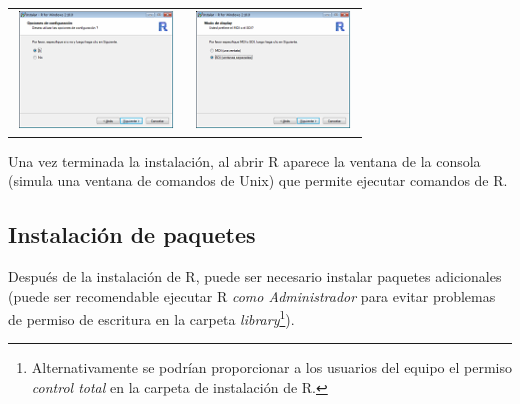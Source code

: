 \documentclass[
]{book}
\begin{document}
\begin{longtable}[]{@{}cc@{}}
\includegraphics[width=0.95\textwidth,height=\textheight]{images/image5.png} & \includegraphics[width=0.95\textwidth,height=\textheight]{images/image6.png} \\
\end{longtable}

Una vez terminada la instalación, al abrir R aparece la ventana de la consola (simula una ventana de comandos de Unix) que permite ejecutar comandos de R.

\subsection{Instalación de paquetes}\label{instalaciuxf3n-de-paquetes}

Después de la instalación de R, puede ser necesario instalar paquetes adicionales (puede ser recomendable ejecutar R \emph{como Administrador} para evitar problemas de permiso de escritura en la carpeta \emph{library}\footnote{Alternativamente se podrían proporcionar a los usuarios del equipo el permiso \emph{control total} en la carpeta de instalación de R.}).
\end{document}
